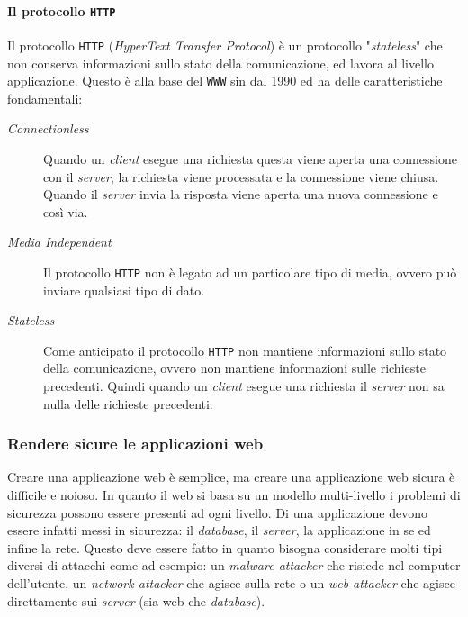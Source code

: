             \paragraph{Il protocollo \texttt{HTTP}} Il protocollo \texttt{HTTP} (\textit{HyperText Transfer Protocol}) è un protocollo "\textit{stateless}" che non conserva informazioni sullo stato della comunicazione, ed lavora al livello applicazione. Questo è alla base del \texttt{WWW} sin dal 1990 ed ha delle caratteristiche fondamentali:\begin{description}
                \item[\textit{Connectionless}] Quando un \textit{client} esegue una richiesta questa viene aperta una connessione con il \textit{server}, la richiesta viene processata e la connessione viene chiusa. Quando il \textit{server} invia la risposta viene aperta una nuova connessione e così via.
                \item[\textit{Media Independent}] Il protocollo \texttt{HTTP} non è legato ad un particolare tipo di media, ovvero può inviare qualsiasi tipo di dato.
                \item[\textit{Stateless}] Come anticipato il protocollo \texttt{HTTP} non mantiene informazioni sullo stato della comunicazione, ovvero non mantiene informazioni sulle richieste precedenti. Quindi quando un \textit{client} esegue una richiesta il \textit{server} non sa nulla delle richieste precedenti.
            \end{description}
        \subsubsection{Rendere sicure le applicazioni web}
            Creare una applicazione web è semplice, ma creare una applicazione web sicura è difficile e noioso. In quanto il web si basa su un modello multi-livello i problemi di sicurezza possono essere presenti ad ogni livello. Di una applicazione devono essere infatti messi in sicurezza: il \textit{database}, il \textit{server}, la applicazione in se ed infine la rete. Questo deve essere fatto in quanto bisogna considerare molti tipi diversi di attacchi come ad esempio: un \textit{malware attacker} che risiede nel computer dell'utente, un \textit{network attacker} che agisce sulla rete o un \textit{web attacker} che agisce direttamente sui \textit{server} (sia web che \textit{database}).
